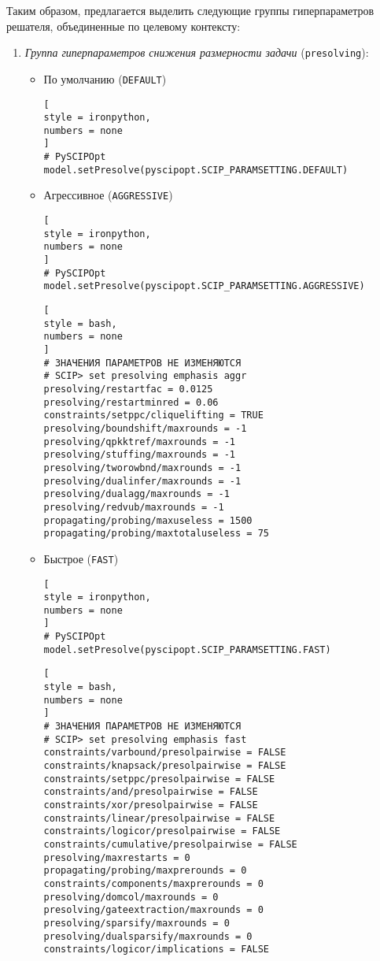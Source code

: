 \documentclass[%
	11pt,
	a4paper,
	utf8,
		]{article}
\begin{document}
Таким образом, предлагается выделить следующие группы гиперпараметров решателя, объединенные по целевому контексту:
\begin{enumerate}
	\item \emph{Группа гиперпараметров снижения размерности задачи} (\verb|presolving|):
	\begin{itemize}
		\item По умолчанию (\verb|DEFAULT|)
\begin{lstlisting}[
style = ironpython,
numbers = none
]
# PySCIPOpt
model.setPresolve(pyscipopt.SCIP_PARAMSETTING.DEFAULT)
\end{lstlisting}
		
		\item Агрессивное (\verb|AGGRESSIVE|)
\begin{lstlisting}[
style = ironpython,
numbers = none
]
# PySCIPOpt
model.setPresolve(pyscipopt.SCIP_PARAMSETTING.AGGRESSIVE)
\end{lstlisting}
\begin{lstlisting}[
style = bash,
numbers = none
]
# ЗНАЧЕНИЯ ПАРАМЕТРОВ НЕ ИЗМЕНЯЮТСЯ
# SCIP> set presolving emphasis aggr
presolving/restartfac = 0.0125
presolving/restartminred = 0.06
constraints/setppc/cliquelifting = TRUE
presolving/boundshift/maxrounds = -1
presolving/qpkktref/maxrounds = -1
presolving/stuffing/maxrounds = -1
presolving/tworowbnd/maxrounds = -1
presolving/dualinfer/maxrounds = -1
presolving/dualagg/maxrounds = -1
presolving/redvub/maxrounds = -1
propagating/probing/maxuseless = 1500
propagating/probing/maxtotaluseless = 75
\end{lstlisting}
		    \item Быстрое (\verb|FAST|)
\begin{lstlisting}[
style = ironpython,
numbers = none
]
# PySCIPOpt
model.setPresolve(pyscipopt.SCIP_PARAMSETTING.FAST)
\end{lstlisting}
\begin{lstlisting}[
style = bash,
numbers = none
]
# ЗНАЧЕНИЯ ПАРАМЕТРОВ НЕ ИЗМЕНЯЮТСЯ
# SCIP> set presolving emphasis fast
constraints/varbound/presolpairwise = FALSE
constraints/knapsack/presolpairwise = FALSE
constraints/setppc/presolpairwise = FALSE
constraints/and/presolpairwise = FALSE
constraints/xor/presolpairwise = FALSE
constraints/linear/presolpairwise = FALSE
constraints/logicor/presolpairwise = FALSE
constraints/cumulative/presolpairwise = FALSE
presolving/maxrestarts = 0
propagating/probing/maxprerounds = 0
constraints/components/maxprerounds = 0
presolving/domcol/maxrounds = 0
presolving/gateextraction/maxrounds = 0
presolving/sparsify/maxrounds = 0
presolving/dualsparsify/maxrounds = 0
constraints/logicor/implications = FALSE
\end{lstlisting}
	\end{itemize}


\end{enumerate}
\end{document}

